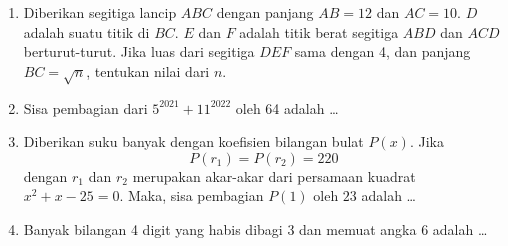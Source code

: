 \begin{enumerate}
\item Diberikan segitiga lancip $ABC$ dengan panjang $AB = 12$ dan $AC = 10$. $D$ adalah suatu titik di $BC$. $E$ dan $F$ adalah titik berat segitiga $ABD$ dan $ACD$ berturut-turut. Jika luas dari segitiga $DEF$ sama dengan 4, dan panjang $BC = \sqrt{n}$, tentukan nilai dari $n$.

\item Sisa pembagian dari $5^{2021}+11^{2022}$ oleh 64 adalah \dots

\item Diberikan suku banyak dengan koefisien bilangan bulat $P(x)$. Jika
$$P(r_1)=P(r_2)=220$$
dengan $r_1$ dan $r_2$ merupakan akar-akar dari persamaan kuadrat $x^2+x-25=0$. Maka, sisa pembagian $P(1)$ oleh $23$ adalah \dots

\item Banyak bilangan 4 digit yang habis dibagi 3 dan memuat angka 6 adalah \dots
\end{enumerate}

\newpage
